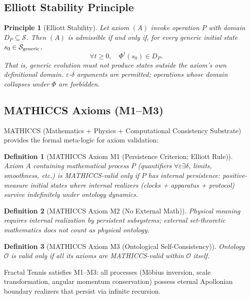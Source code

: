 \documentclass[11pt,a4paper]{article}
\newtheorem{definition}{Definition}
\newtheorem{principle}{Principle}
\begin{document}
\subsection{Elliott Stability Principle}
\begin{principle}[Elliott Stability]
Let axiom $(A)$ invoke operation $P$ with domain $D_P\subseteq\mathcal{S}$. Then $(A)$ is admissible if and only if, for every generic initial state $s_0\in\mathcal{S}_{\rm generic}$,
\[
\forall t\geq 0,\quad \Phi^t(s_0)\in D_P.
\]
That is, generic evolution must not produce states outside the axiom's own definitional domain. $\varepsilon$-$\delta$ arguments are permitted; operations whose domain collapses under $\Phi$ are forbidden.
\end{principle}

\subsection{MATHICCS Axioms (M1--M3)}
MATHICCS (Mathematics + Physics + Computational Consistency Substrate) provides the formal meta-logic for axiom validation:

\begin{definition}[MATHICCS Axiom M1 (Persistence Criterion; Elliott Rule)]
Axiom $A$ containing mathematical process $P$ (quantifiers $\forall\varepsilon\exists\delta$, limits, smoothness, etc.) is MATHICCS-valid only if $P$ has \emph{internal persistence}: positive-measure initial states where internal realizers (clocks + apparatus + protocol) survive indefinitely under ontology dynamics.
\end{definition}

\begin{definition}[MATHICCS Axiom M2 (No External Math)]
Physical meaning requires internal realization by persistent subsystems; external set-theoretic mathematics does not count as physical ontology.
\end{definition}

\begin{definition}[MATHICCS Axiom M3 (Ontological Self-Consistency)]
Ontology $\mathcal{O}$ is valid only if all its axioms are MATHICCS-valid within $\mathcal{O}$ itself.
\end{definition}

Fractal Tennis satisfies M1--M3: all processes (M\"obius inversion, scale transformation, angular momentum conservation) possess eternal Apollonian boundary realizers that persist via infinite recursion.
\end{document}

